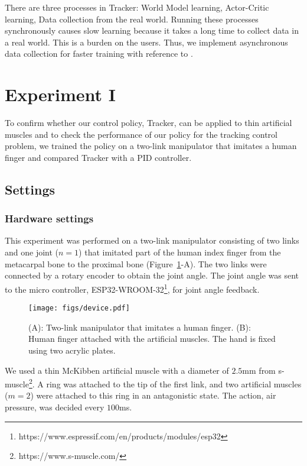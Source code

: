 \documentclass[letterpaper, 10 pt, conference]{ieeeconf}  %
\newcommand{\figref}{Figure~\ref}
\begin{document}
There are three processes in Tracker: World Model learning, Actor-Critic learning, Data collection from the real world. Running these processes synchronously causes slow learning because it takes a long time to collect data in a real world. This is a burden on the users. Thus, we implement asynchronous data collection for faster training with reference to \cite{zhang2020asynchronous}.

\section{Experiment I}\label{ex1}
To confirm whether our control policy, Tracker, can be applied to thin artificial muscles and to check the performance of our policy for the tracking control problem, we trained the policy on a two-link manipulator that imitates a human finger and compared Tracker with a PID controller.
\subsection{Settings}

\subsubsection{Hardware settings}
This experiment was performed on a two-link manipulator consisting of two links and one joint ($n=1$) that imitated part of the human index finger from the metacarpal bone to the proximal bone (\figref{fig:platform}-A). The two links were connected by a rotary encoder to obtain the joint angle. The joint angle was sent to the micro controller, ESP32-WROOM-32\footnote{https://www.espressif.com/en/products/modules/esp32}, for joint angle feedback. 

\begin{figure}[tb]
\begin{center}
    \texttt{[image: figs/device.pdf]}
    \caption{(A): Two-link manipulator that imitates a human finger. (B): Human finger attached with the artificial muscles. The hand is fixed using two acrylic plates.}
    \label{fig:platform}
\end{center}
\end{figure}

We used a thin McKibben artificial muscle with a diameter of $2.5$mm from s-muscle\footnote{https://www.s-muscle.com/}. A ring was attached to the tip of the first link, and two artificial muscles ($m=2$) were attached to this ring in an antagonistic state. 
The action, air pressure, was decided every $100$ms.
\end{document}
